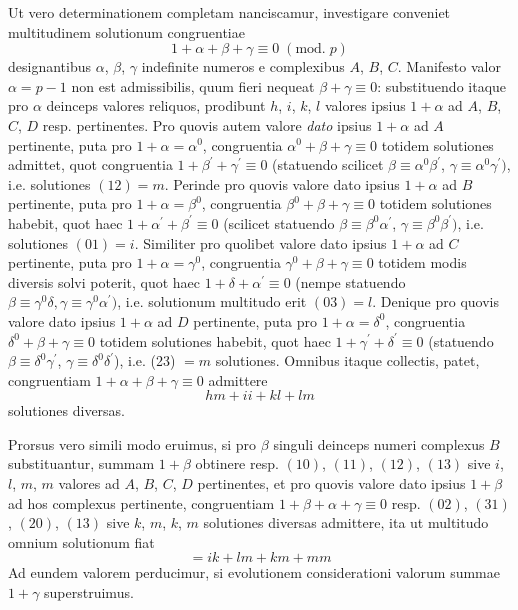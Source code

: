 \documentclass[twoside,12pt, showframe]{memoir}
\renewcommand{\pmod}[1]{\;(\textrm{mod.}\;#1)}
\begin{document}
Ut vero determinationem completam nanciscamur, investigare conveniet multitudinem solutionum congruentiae
\[1+\alpha+\beta+\gamma \equiv 0\pmod{p}\]
designantibus \(\alpha\), \(\beta\), \(\gamma\) indefinite numeros e complexibus \(A\), \(B\), \(C\). Manifesto valor \(\alpha=p-1\) non est admissibilis, quum fieri nequeat \(\beta+\gamma \equiv 0\): substituendo itaque pro \(\alpha\) deinceps valores reliquos, prodibunt \(h\), \(i\), \(k\), \(l\) valores ipsius \(1+\alpha\) ad \(A\), \(B\), \(C\), \(D\) resp. pertinentes. Pro quovis autem valore \textit{dato} ipsius \(1+\alpha\) ad \(A\) pertinente, puta pro \(1+\alpha=\alpha^{0}\), congruentia \(\alpha^{0}+\beta+\gamma \equiv 0\) totidem solutiones admittet, quot congruentia \(1+\beta^{\prime}+\gamma^{\prime} \equiv 0\) (statuendo scilicet \(\beta \equiv \alpha^{0} \beta^{\prime}\), \(\gamma \equiv \alpha^{0} \gamma^{\prime})\), i.e. solutiones \((12)=m\). Perinde pro quovis valore dato ipsius \(1+\alpha\) ad \(B\) pertinente, puta pro \(1+\alpha=\beta^{0}\), congruentia \(\beta^{0}+\beta+\gamma \equiv 0\) totidem solutiones habebit, quot haec \(1+\alpha^{\prime}+\beta^{\prime} \equiv 0\) (scilicet statuendo \(\beta \equiv \beta^{0} \alpha^{\prime}\), \(\gamma \equiv \beta^{0} \beta^{\prime})\), i.e. solutiones \((01)=i\). Similiter pro quolibet valore dato ipsius \(1+\alpha\) ad \(C\) pertinente, puta pro \(1+\alpha=\gamma^{0}\), congruentia \(\gamma^{0}+\beta+\gamma \equiv 0\) totidem modis diversis solvi poterit, quot haec \(1+\delta+\alpha^{\prime} \equiv 0\) (nempe statuendo \(\beta \equiv \gamma^{0} \delta, \gamma \equiv \gamma^{0} \alpha^{\prime})\), i.e. solutionum multitudo erit \((03)=l\). Denique pro quovis valore dato ipsius \(1+\alpha\) ad \(D\) pertinente, puta pro \(1+\alpha=\delta^{0}\), congruentia \(\delta^{0}+\beta+\gamma \equiv 0\) totidem solutiones habebit, quot haec \(1+\gamma^{\prime}+\delta^{\prime} \equiv 0\) (statuendo \(\beta \equiv \delta^{0} \gamma^{\prime}\), \(\gamma \equiv \delta^{0} \delta^{\prime}\)), i.e. (23) \(=m\) solutiones. Omnibus itaque collectis, patet, congruentiam \(1+\alpha+\beta+\gamma \equiv 0\) admittere
\[h m+i i+k l+l m\]
solutiones diversas.

Prorsus vero simili modo eruimus, si pro \(\beta\) singuli deinceps numeri complexus \(B\) substituantur, summam \(1+\beta\) obtinere resp. \((10)\), \((11)\), \((12)\), \((13)\) sive \(i\), \(l\), \(m\), \(m\) valores ad \(A\), \(B\), \(C\), \(D\) pertinentes, et pro quovis valore dato ipsius \(1+\beta\) ad hos complexus pertinente, congruentiam \(1+\beta+\alpha+\gamma \equiv 0\) resp. \((02)\), \((31)\), \((20)\), \((13)\) sive \(k\), \(m\), \(k\), \(m\) solutiones diversas admittere, ita ut multitudo omnium solutionum fiat\clearpage\noindent%
\[=i k+l m+k m+m m\]
Ad eundem valorem perducimur, si evolutionem considerationi valorum summae \(1+\gamma\) superstruimus.
\end{document}
